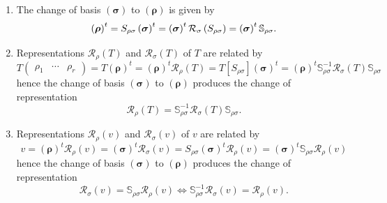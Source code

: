 \documentclass[aps,preprint]{revtex4}
\begin{document}
\begin{enumerate}
\item The change of basis $\left( \boldsymbol{\sigma }\right) $ to $\left( 
\boldsymbol{\rho }\right) $ is given by 
\begin{equation}
\left( \boldsymbol{\rho }\right) ^{t}=S_{\rho \sigma }\left( \boldsymbol{%
\sigma }\right) ^{t}=\left( \boldsymbol{\sigma }\right) ^{t}\mathcal{R}%
_{\sigma }\left( S_{\rho \sigma }\right) =\left( \boldsymbol{\sigma }\right)
^{t}\mathbb{S}_{\rho \sigma }.
\end{equation}

\item Representations $\mathcal{R}_{\rho }\left( T\right) $ and $\mathcal{R}%
_{\sigma }\left( T\right) $ of $T$ are related by 
\begin{equation}
T\left( 
\begin{array}{ccc}
\rho _{1} & \cdots & \rho _{r}%
\end{array}%
\right) =T\left( \boldsymbol{\rho }\right) ^{t}=\left( \boldsymbol{\rho }%
\right) ^{t}\mathcal{R}_{\rho }\left( T\right) =T\left[ S_{\rho \sigma }%
\right] \left( \boldsymbol{\sigma }\right) ^{t}=\left( \boldsymbol{\rho }%
\right) ^{t}\mathbb{S}_{\rho \sigma }^{-1}\mathcal{R}_{\sigma }\left(
T\right) \mathbb{S}_{\rho \sigma }
\end{equation}%
hence the change of basis $\left( \boldsymbol{\sigma }\right) $ to $\left( 
\boldsymbol{\rho }\right) $ produces the change of representation 
\begin{equation}
\mathcal{R}_{\rho }\left( T\right) =\mathbb{S}_{\rho \sigma }^{-1}\mathcal{R}%
_{\sigma }\left( T\right) \mathbb{S}_{\rho \sigma }.
\end{equation}

\item Representations $\mathcal{R}_{\rho }\left( v\right) $ and $\mathcal{R}%
_{\sigma }\left( v\right) $ of $v$ are related by 
\begin{equation}
v=\left( \boldsymbol{\rho }\right) ^{t}\mathcal{R}_{\rho }\left( v\right)
=\left( \boldsymbol{\sigma }\right) ^{t}\mathcal{R}_{\sigma }\left( v\right)
=S_{\rho \sigma }\left( \boldsymbol{\sigma }\right) ^{t}\mathcal{R}_{\rho
}\left( v\right) =\left( \boldsymbol{\sigma }\right) ^{t}\mathbb{S}_{\rho
\sigma }\mathcal{R}_{\rho }\left( v\right)
\end{equation}%
hence the change of basis $\left( \boldsymbol{\sigma }\right) $ to $\left( 
\boldsymbol{\rho }\right) $ produces the change of representation 
\begin{equation}
\mathcal{R}_{\sigma }\left( v\right) =\mathbb{S}_{\rho \sigma }\mathcal{R}%
_{\rho }\left( v\right) \Leftrightarrow \mathbb{S}_{\rho \sigma }^{-1}%
\mathcal{R}_{\sigma }\left( v\right) =\mathcal{R}_{\rho }\left( v\right) .
\end{equation}
\end{enumerate}
\end{document}
